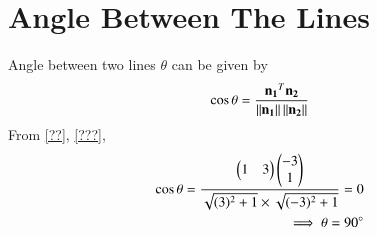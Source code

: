 \documentclass[journal,12pt,twocolumn]{IEEEtran}
\begin{document}
\section{Angle Between The Lines}
Angle between two lines $\theta$ can be given by
\begin{align}
\cos \theta = \frac{\mathbf{n_1}^T\mathbf{n_2}}{\left\lVert\mathbf{n_1}\right\rVert\left\lVert\mathbf{n_2}\right\rVert}
\end{align}
From \ref{??}, \ref{???},
\begin{align}
\cos \theta=\frac{\begin{pmatrix}1&3\end{pmatrix}\begin{pmatrix}-3\\1\end{pmatrix}}{\sqrt{(3)^2 +1} \times \sqrt{(-3)^2 +1}}=0\\
\implies \theta = 90\degree
\end{align}
\end{document}
